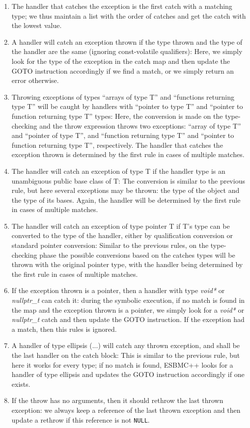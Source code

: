 \documentclass[conference]{IEEEtran}
\begin{document}
\begin{enumerate}
 \item The handler that catches the exception is the first catch with a matching type; we thus maintain a list with the order of
       catches and get the catch with the lowest value.
 \item A handler will catch an exception thrown if the type thrown and the type of the handler are the same (ignoring const-volatile
       qualifiers): Here, we simply look for the type of the exception in the catch map and then update the GOTO instruction accordingly
       if we find a match, or we simply return an error otherwise.
 \item Throwing exceptions of types
  ``arrays of type T'' and ``functions returning type T'' will be caught by handlers with ``pointer to type T'' and
       ``pointer to function returning type T'' types: Here, the conversion is made on the type-checking and the throw expression
       throws two exceptions: ``array of type T'' and ``pointer of type T'', and ``function returning type T'' and ``pointer to function
       returning type T'', respectively. The handler that catches the exception thrown is determined by the first rule in cases of
       multiple  matches.
 \item The handler will catch an exception of type T if the handler type is an unambiguous public base class of T: The conversion is
       similar to the previous rule, but here several exceptions may be thrown: the type of the object and the
       type of its bases. Again, the handler will be determined by the first rule in cases of multiple matches.
 \item The handler will catch an exception of type pointer T if T's type can be converted to the type of the handler, either by
       qualification conversion or standard pointer conversion: Similar to the previous rules, on the type-checking phase the possible
       conversions based on the catches types will be thrown with the original pointer type, with the handler being determined by the first
       rule in cases of multiple matches.
 \item If the exception thrown is a pointer, then a handler with type \textit{void*} or \textit{nullptr\_t} can catch it: during the
       symbolic execution, if no match is found in the map and the exception thrown is a pointer, we simply look for a
       \textit{void*} or \textit{nullptr\_t} catch and then update the GOTO instruction. If the exception had a match, then this rules is
       ignored.
 \item A handler of type ellipsis (...) will catch any thrown exception, and shall be the last handler on the catch block: This is similar to the
       previous rule, but here it works for every type; if no match is found, ESBMC++ looks for a handler of type ellipsis and updates the GOTO
       instruction accordingly if one exists.
 \item If the throw has no arguments, then it should rethrow the last thrown exception: we always keep a reference of the last
       thrown exception and then update a rethrow if this reference is not \verb|NULL|.
\end{enumerate}
\end{document}
